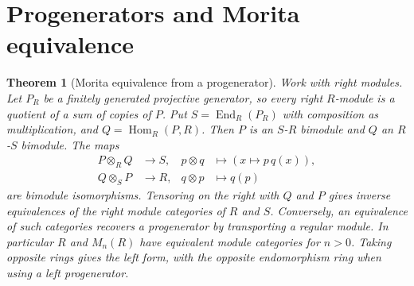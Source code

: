 \documentclass[11pt,oneside,openany]{book}
\newtheorem{theorem}{Theorem}[chapter]
\theoremstyle{definition}
\theoremstyle{remark}
\begin{document}
\section{Progenerators and Morita equivalence}

\begin{theorem}[Morita equivalence from a progenerator]
\label{p103:ALG-03-C02-S05}
Work with right modules. Let \(P_R\) be a finitely generated
projective generator, so every right \(R\)-module is a quotient of
a sum of copies of \(P\). Put \(S=\operatorname{End}_R(P_R)\) with
composition as multiplication, and \(Q=\operatorname{Hom}_R(P,R)\).
Then \(P\) is an \(S\)-\(R\) bimodule and \(Q\) an \(R\)-\(S\)
bimodule. The maps
\[
 \begin{aligned}
 P\otimes_R Q&\longrightarrow S,&
 p\otimes q&\longmapsto (x\mapsto p\,q(x)),\\
 Q\otimes_S P&\longrightarrow R,&
 q\otimes p&\longmapsto q(p)
 \end{aligned}
\]
are bimodule isomorphisms. Tensoring on the right with \(Q\)
and \(P\) gives inverse equivalences of the right module categories
of \(R\) and \(S\). Conversely, an equivalence of such categories
recovers a progenerator by transporting a regular module.
In particular \(R\) and \(M_n(R)\) have equivalent module
categories for \(n>0\). Taking opposite rings gives the left
form, with the opposite endomorphism ring when using a left
progenerator.
\end{theorem}
\end{document}
